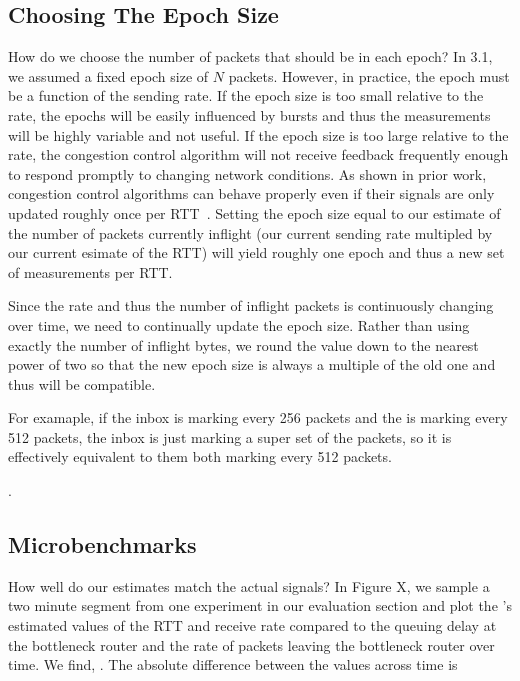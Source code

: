 \subsection{Choosing The Epoch Size}
\label{s:measure:epoch}
How do we choose the number of packets that should be in each epoch?
In 3.1, we assumed a fixed epoch size of $N$ packets.
However, in practice, the epoch must be a function of the sending rate.
If the epoch size is too small relative to the rate,
the epochs will be easily influenced by bursts and thus the measurements will be highly variable
and not useful.
If the epoch size is too large relative to the rate, the congestion control algorithm will not
receive feedback frequently enough to respond promptly to changing network conditions. 
As shown in prior work, congestion control algorithms can behave properly even if their
signals are only updated roughly once per RTT~\cite{ccp-hotnets}.
Setting the epoch size equal to our estimate of the number of packets currently inflight 
(our current sending rate multipled by our current esimate of the RTT) will yield roughly
one epoch and thus a new set of measurements per RTT.

Since the rate and thus the number of inflight packets is continuously changing over time,
we need to continually update the epoch size. Rather than using exactly the number of inflight
bytes, we round the value down to the nearest power of two so that the new epoch size is
always a multiple of the old one and thus will be compatible. 

For examaple, 
if the inbox is marking every 256 packets
and the \outbox is marking every 512 packets, 
the inbox is just marking a super set of the \outbox packets, 
so it is effectively equivalent to them both marking every 512 packets.

.
    
\subsection{Microbenchmarks}
\label{s:measure:microbench}

    How well do our estimates match the actual signals? In Figure X, we sample a two minute segment from 
    one experiment in our evaluation section and plot the \inbox's estimated values 
    of the RTT and receive rate compared to the queuing delay at the bottleneck router and the rate of packets leaving the bottleneck router over time. 
    We find, . The absolute difference between the values across time is  

